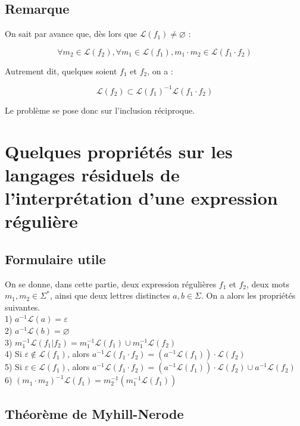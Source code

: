 \documentclass{article}
\begin{document}
\subsection{Remarque}

On sait par avance que, dès lors que $\mathcal{L}(f_1) \neq \varnothing$ :

$$\forall m_2 \in \mathcal{L}(f_2), \forall m_1 \in \mathcal{L}(f_1), m_1 \cdot m_2 \in \mathcal{L}(f_1 \cdot f_2)$$

Autrement dit, quelques soient $f_1$ et $f_2$, on a :

$$\mathcal{L}(f_2) \subset \mathcal{L}(f_1)^{-1}\mathcal{L}(f_1 \cdot f_2)$$

Le problème se pose donc sur l'inclusion réciproque.

\section{Quelques propriétés sur les langages résiduels de l'interprétation d'une expression régulière}

\subsection{Formulaire utile}
On se donne, dans cette partie, deux expression régulières $f_1$ et $f_2$, deux mots $m_1,m_2 \in \Sigma^*$, ainsi que deux lettres distinctes $a,b \in \Sigma$. On a alors les propriétés suivantes.
\\

1) $a^{-1}\mathcal{L}(a) = \varepsilon$
\\

2) $a^{-1}\mathcal{L}(b) = \varnothing$
\\

3) $m_1^{-1}\mathcal{L}(f_1 | f_2) = m_1^{-1}\mathcal{L}(f_1) \cup m_1^{-1}\mathcal{L}(f_2)$
\\

4) Si $\varepsilon \notin \mathcal{L}(f_1)$, alors $a^{-1}\mathcal{L}(f_1 \cdot f_2) = (a^{-1}\mathcal{L}(f_1))\cdot\mathcal{L}(f_2)$
\\

5) Si $\varepsilon \in \mathcal{L}(f_1)$, alors $a^{-1}\mathcal{L}(f_1 \cdot f_2) = (a^{-1}\mathcal{L}(f_1))\cdot\mathcal{L}(f_2) \cup a^{-1}\mathcal{L}(f_2)$
\\

6) $(m_1 \cdot m_2)^{-1}\mathcal{L}(f_1) = m_2^{-1}(m_1^{-1}\mathcal{L}(f_1))$

\subsection{Théorème de Myhill-Nerode}
\end{document}
